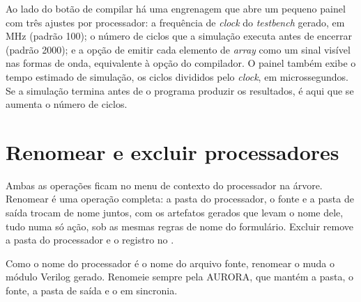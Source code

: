 Ao lado do botão de compilar há uma engrenagem que abre um pequeno painel com três ajustes por processador: a frequência de \textit{clock} do \textit{testbench} gerado, em MHz (padrão 100); o número de ciclos que a simulação executa antes de encerrar (padrão 2000); e a opção de emitir cada elemento de \textit{array} como um sinal visível nas formas de onda, equivalente à opção  do compilador. O painel também exibe o tempo estimado de simulação, os ciclos divididos pelo \textit{clock}, em microssegundos. Se a simulação termina antes de o programa produzir os resultados, é aqui que se aumenta o número de ciclos.

\section{Renomear e excluir processadores}

Ambas as operações ficam no menu de contexto do processador na árvore. Renomear é uma operação completa: a pasta do processador, o fonte e a pasta de saída trocam de nome juntos, com os artefatos gerados que levam o nome dele, tudo numa só ação, sob as mesmas regras de nome do formulário. Excluir remove a pasta do processador e o registro no .

\begin{aviso}
Como o nome do processador é o nome do arquivo fonte, renomear o  muda o módulo Verilog gerado. Renomeie sempre pela AURORA, que mantém a pasta, o fonte, a pasta de saída e o  em sincronia.
\end{aviso}
